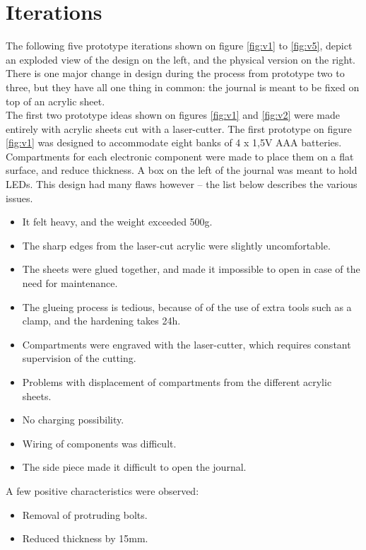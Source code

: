 \section{Iterations}

The following five prototype iterations shown on figure \ref{fig:v1} to \ref{fig:v5}, depict an exploded view of the design on the left, and the physical version on the right. There is one major change in design during the process from prototype two to three, but they have all one thing in common: the journal is meant to be fixed on top of an acrylic sheet. \\

The first two prototype ideas shown on figures \ref{fig:v1} and \ref{fig:v2} were made entirely with acrylic sheets cut with a laser-cutter. The first prototype on figure \ref{fig:v1} was designed to accommodate eight banks of 4 x 1,5V AAA batteries. Compartments for each electronic component were made to place them on a flat surface, and reduce thickness. A box on the left of the journal was meant to hold LEDs. This design had many flaws however -- the list below describes the various issues.

\begin{itemize} \itemsep0em
  \item It felt heavy, and the weight exceeded 500g.
  \item The sharp edges from the laser-cut acrylic were slightly uncomfortable.
  \item The sheets were glued together, and made it impossible to open in case of the need for maintenance.
  \item The glueing process is tedious, because of of the use of extra tools such as a clamp, and the hardening takes 24h.
  \item Compartments were engraved with the laser-cutter, which requires constant supervision of the cutting.
  \item Problems with displacement of compartments from the different acrylic sheets.
  \item No charging possibility.
  \item Wiring of components was difficult.
  \item The side piece made it difficult to open the journal.
\end{itemize}

A few positive characteristics were observed:
\begin{itemize} \itemsep0em
  \item Removal of protruding bolts.
  \item Reduced thickness by 15mm.
\end{itemize}


